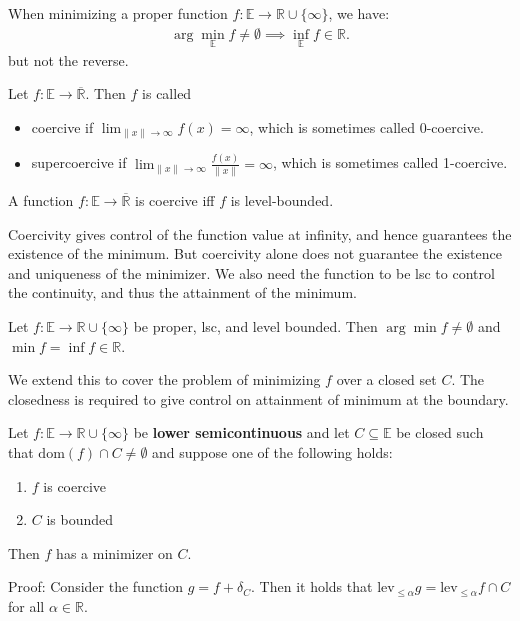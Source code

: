 \documentclass{tufte-handout}
\begin{document}
When minimizing a proper function \( f: \mathbb{E}\to \mathbb{R} \cup \{\infty\}\),
we have:
\begin{align}
    \arg\min_\mathbb{E} f \neq \emptyset \implies \inf_\mathbb{E} f \in \mathbb{R}.
\end{align}
but not the reverse.

\begin{Definition}
    Let \( f:\mathbb{E}\to \overline{\mathbb{R}} \). Then \( f \) is called 
    \begin{itemize}
        \item coercive if \( \lim_{\|x\|\to \infty} f(x) = \infty \), which is sometimes called 0-coercive.
        \item supercoercive if \( \lim_{\|x\|\to \infty} \frac{f(x)}{\|x\|} = \infty \), which is sometimes called 1-coercive.
    \end{itemize}
\end{Definition}
\begin{Lemma}
    A function \( f:\mathbb{E}\to \overline{\mathbb{R}} \) is coercive iff \( f \) is level-bounded.
\end{Lemma}

Coercivity gives control of the function value at infinity, and hence guarantees the existence of the 
minimum.
But coercivity alone does not guarantee the existence and  uniqueness of the minimizer.
We also need the function to be lsc to control the continuity, and thus the 
attainment of the minimum.

\begin{Theorem}
    \label{thm:exi_min}
    Let \( f:\mathbb{E}\to \mathbb{R}\cup\{\infty\} \) be proper, 
    lsc, and level bounded. Then \( \arg\min f \neq \emptyset \)
    and \( \min f = \inf f \in \mathbb{R} \).
\end{Theorem}

We extend this to cover the problem of minimizing \( f \) over a closed set \( C \).
The closedness is required to give control on attainment of minimum 
at the boundary.
\begin{Corollary}
    \label{col:exi_minimizer}
    Let \( f:\mathbb{E}\to \mathbb{R}\cup \{\infty\} \) be  \textbf{lower semicontinuous} and let 
    \( C \subseteq \mathbb{E} \) be closed such that \( \text{dom}(f) \cap C \neq \emptyset \)
    and suppose one of the following holds:
    \begin{enumerate}
        \item \( f \) is coercive
        \item \( C \) is bounded
    \end{enumerate}
    Then \( f \) has a minimizer on \( C \).
\end{Corollary}
Proof: Consider the function \( g = f + \delta_C \).
Then it holds that \(\text{lev}_{\leq \alpha} g = \text{lev}_{\leq \alpha} f \cap C\) for all \( \alpha \in \mathbb{R} \).
\end{document}
